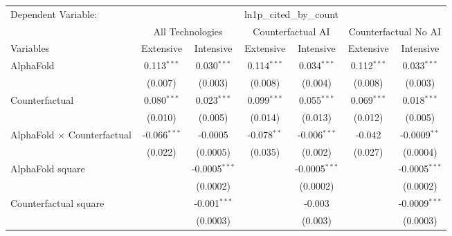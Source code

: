 \begingroup
\centering
\begin{tabular}{lcccccc}
   \tabularnewline \midrule \midrule
   Dependent Variable: & \multicolumn{6}{c}{ln1p\_cited\_by\_count}\\
 & \multicolumn{2}{c}{All Technologies} & \multicolumn{2}{c}{Counterfactual AI} & \multicolumn{2}{c}{Counterfactual No AI} \\
\cmidrule(lr){1-1}\cmidrule(lr){2-3} \cmidrule(lr){4-5} \cmidrule(lr){6-7}
Variables & \multicolumn{1}{c}{Extensive} & \multicolumn{1}{c}{Intensive} & \multicolumn{1}{c}{Extensive} & \multicolumn{1}{c}{Intensive} & \multicolumn{1}{c}{Extensive} & \multicolumn{1}{c}{Intensive} \\
\cmidrule(lr){1-1}\cmidrule(lr){2-2} \cmidrule(lr){3-3} \cmidrule(lr){4-4} \cmidrule(lr){5-5} \cmidrule(lr){6-6} \cmidrule(lr){7-7}
   AlphaFold                          & 0.113$^{***}$  & 0.030$^{***}$     & 0.114$^{***}$ & 0.034$^{***}$    & 0.112$^{***}$ & 0.033$^{***}$\\   
                                      & (0.007)        & (0.003)           & (0.008)       & (0.004)          & (0.008)       & (0.003)\\   
   Counterfactual                     & 0.080$^{***}$  & 0.023$^{***}$     & 0.099$^{***}$ & 0.055$^{***}$    & 0.069$^{***}$ & 0.018$^{***}$\\   
                                      & (0.010)        & (0.005)           & (0.014)       & (0.013)          & (0.012)       & (0.005)\\   
   AlphaFold $\times$ Counterfactual  & -0.066$^{***}$ & -0.0005           & -0.078$^{**}$ & -0.006$^{***}$   & -0.042        & -0.0009$^{**}$\\   
                                      & (0.022)        & (0.0005)          & (0.035)       & (0.002)          & (0.027)       & (0.0004)\\   
   AlphaFold square                   &                & -0.0005$^{***}$   &               & -0.0005$^{***}$  &               & -0.0005$^{***}$\\   
                                      &                & (0.0002)          &               & (0.0002)         &               & (0.0002)\\   
   Counterfactual square              &                & -0.001$^{***}$    &               & -0.003           &               & -0.0009$^{***}$\\   
                                      &                & (0.0003)          &               & (0.003)          &               & (0.0003)\\   

\end{tabular}
